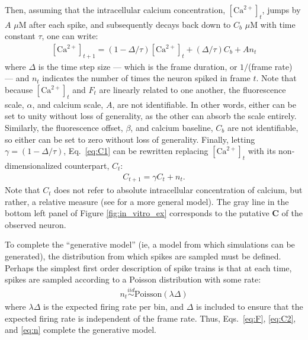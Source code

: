 \documentclass{article}
\providecommand{\ve}[1]{\boldsymbol{#1}}
\newcommand{\Ca}{[\text{Ca}^{2+}]}
\newcommand{\bC}{\ve{C}}
\newcommand{\Del}{\Delta}
\newcommand{\lam}{\lambda}
\newcommand{\gam}{\gamma}
\begin{document}
Then, assuming that the intracellular calcium concentration, $\Ca_t$, jumps by $A$ $\mu$M after each spike, and subsequently decays back down to $C_b$ $\mu$M with time constant $\tau$, one can write:
\begin{align} \label{eq:C1}
\Ca_{t+1} = (1- \Del/\tau ) \Ca_t + (\Del/\tau) C_b + A n_t
\end{align}
\noindent where $\Del$ is the time step size --- which is the frame duration, or $1/$(frame rate) --- and $n_t$ indicates the number of times the neuron spiked in frame $t$. %
Note that because $\Ca_t$ and $F_t$ are linearly related to one another, the fluorescence scale, $\alpha$, and calcium scale, $A$, are not identifiable.  In other words, either can be set to unity without loss of generality, as the other can absorb the scale entirely. Similarly, the fluorescence offset, $\beta$, and calcium baseline, $C_b$ are not identifiable, so either can be set to zero without loss of generality.  Finally, letting $\gam=(1-\Del/\tau)$, Eq.~\eqref{eq:C1} can be rewritten replacing $\Ca_t$ with its non-dimensionalized counterpart, $C_t$: 
\begin{align} \label{eq:C2}
	 C_{t+1}=\gam C_t + n_t.
\end{align} 
\noindent Note that $C_t$ does not refer to absolute intracellular concentration of calcium, but rather, a relative measure (see \cite{VogelsteinPaninski09} for a more general model).  The gray line in the bottom left panel of Figure \ref{fig:in_vitro_ex} corresponds to the putative $\bC$ of the observed neuron.  

To complete the ``generative model'' (ie, a model from which simulations can be generated), the distribution from which spikes are sampled must be defined.  Perhaps the simplest first order description of spike trains is that at each time, spikes are sampled according to a Poisson distribution with some rate:
\begin{align} \label{eq:n}
	n_t \overset{iid}{\sim} \text{Poisson}(\lam \Del)
\end{align}
\noindent where $\lam \Del$ is the expected firing rate per bin, and $\Del$ is included to ensure that the expected firing rate is independent of the frame rate.  Thus, Eqs.~\eqref{eq:F}, \eqref{eq:C2}, and \eqref{eq:n} complete the generative model.  
\end{document}
